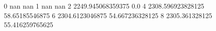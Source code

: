 0 nan nan
1 nan nan
2 2249.945068359375 0.0
4 2308.596923828125 58.65185546875
6 2304.6123046875 54.667236328125
8 2305.361328125 55.416259765625

